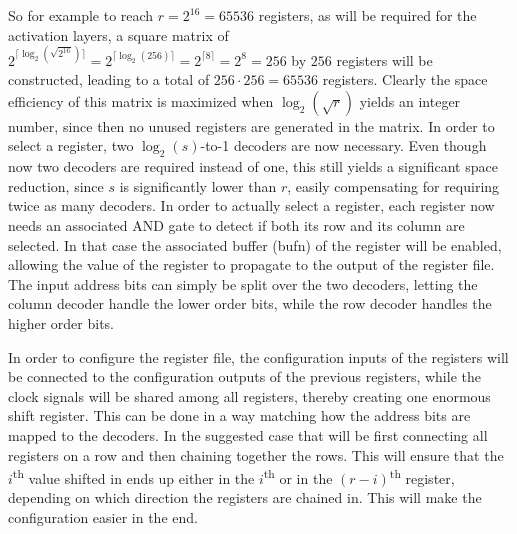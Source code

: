 \documentclass[a4paper, 9pt, conference, onecolumn]{ieeeconf}
\begin{document}
\begin{itemize}
    So for example to reach $r = 2^{16} = 65536$ registers, as will be required for the activation layers, a square matrix of $2^{\lceil\log_{2}(\sqrt{2^{16}})\rceil} = 2^{\lceil\log_{2}(256)\rceil} = 2^{\lceil8\rceil} = 2^{8} = 256$ by $256$ registers will be constructed, leading to a total of $256 \cdot 256 = 65536$ registers. Clearly the space efficiency of this matrix is maximized when $\log_{2}(\sqrt{r})$ yields an integer number, since then no unused registers are generated in the matrix. In order to select a register, two $\log_{2}(s)$-to-1 decoders are now necessary. Even though now two decoders are required instead of one, this still yields a significant space reduction, since $s$ is significantly lower than $r$, easily compensating for requiring twice as many decoders. In order to actually select a register, each register now needs an associated AND gate to detect if both its row and its column are selected. In that case the associated buffer (bufn) of the register will be enabled, allowing the value of the register to propagate to the output of the register file. The input address bits can simply be split over the two decoders, letting the column decoder handle the lower order bits, while the row decoder handles the higher order bits.
    
    In order to configure the register file, the configuration inputs of the registers will be connected to the configuration outputs of the previous registers, while the clock signals will be shared among all registers, thereby creating one enormous shift register. This can be done in a way matching how the address bits are mapped to the decoders. In the suggested case that will be first connecting all registers on a row and then chaining together the rows. This will ensure that the $i$\textsuperscript{th} value shifted in ends up either in the $i$\textsuperscript{th} or in the $(r - i)$\textsuperscript{th} register, depending on which direction the registers are chained in. This will make the configuration easier in the end.
    

\end{itemize}
\end{document}

